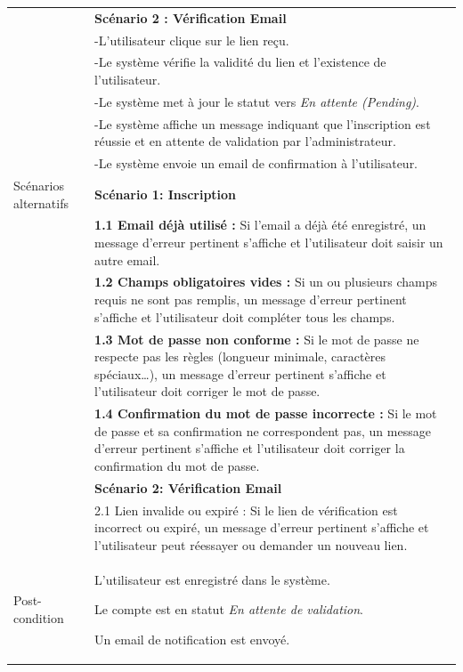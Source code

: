 \begin{longtable}{|l|p{12cm}|}
\hline
\vspace{0.3cm}
& \textbf{Scénario 2 : Vérification Email} \\
& -L’utilisateur clique sur le lien reçu. \\
& -Le système vérifie la validité du lien et l’existence de l’utilisateur. \\
& -Le système met à jour le statut vers \textit{En attente (Pending)}. \\
& -Le système affiche un message indiquant que l’inscription est réussie et en attente de validation par l’administrateur. \\
& -Le système envoie un email de confirmation à l’utilisateur. \\
\hline
Scénarios alternatifs & 
\textbf{Scénario 1: Inscription} \\
& \textbf{1.1 Email déjà utilisé :} Si l’email a déjà été enregistré, un message d’erreur pertinent s’affiche et l’utilisateur doit saisir un autre email. \\
& \textbf{1.2 Champs obligatoires vides :} Si un ou plusieurs champs requis ne sont pas remplis, un message d’erreur pertinent s’affiche et l’utilisateur doit compléter tous les champs. \\
& \textbf{1.3 Mot de passe non conforme :} Si le mot de passe ne respecte pas les règles (longueur minimale, caractères spéciaux…), un message d’erreur pertinent s’affiche et l’utilisateur doit corriger le mot de passe. \\
& \textbf{1.4 Confirmation du mot de passe incorrecte :} Si le mot de passe et sa confirmation ne correspondent pas, un message d’erreur pertinent s’affiche et l’utilisateur doit corriger la confirmation du mot de passe. \\
& \textbf{Scénario 2: Vérification Email} \\
& 2.1 Lien invalide ou expiré : Si le lien  de vérification est incorrect ou expiré, un message d’erreur pertinent s’affiche et l’utilisateur peut réessayer ou demander un nouveau lien. \\
\hline
Post-condition &

L’utilisateur est enregistré dans le système.

Le compte est en statut \textit{En attente de validation}.

Un email de notification est envoyé.
 \\
\hline
\end{longtable}
\vspace{0.2cm}


